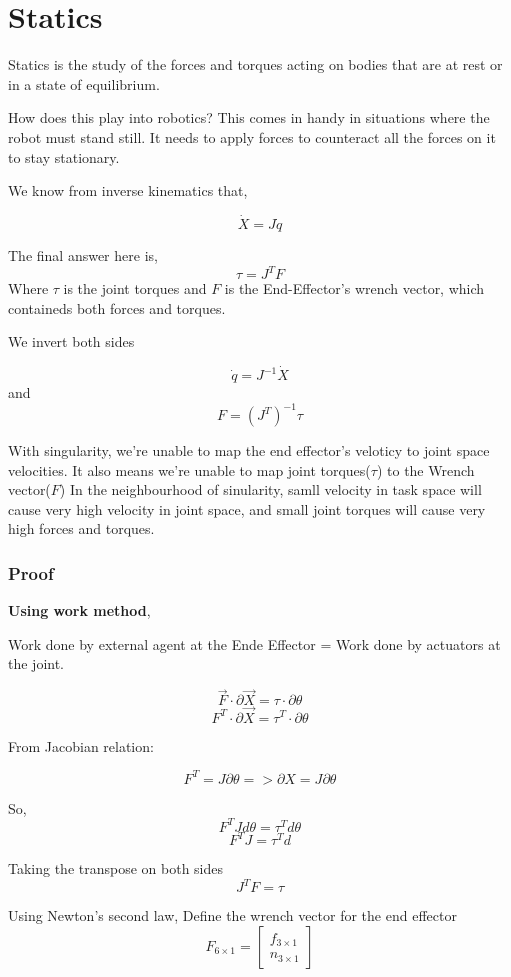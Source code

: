 \documentclass[11pt]{report}
\begin{document}
\part{Statics}
\label{sec:org2be51d6}
Statics is the study of the forces and torques acting on bodies that are at rest or in a state of equilibrium.

How does this play into robotics? This comes in handy in situations where the robot must stand still. It needs to apply forces to counteract all the forces on it to stay stationary.

We know from inverse kinematics that,

$$\dot{X} = J \dot{q}$$

The final answer here is,
$$\tau = J^TF$$
Where \(\tau\) is the joint torques and \(F\) is the End-Effector's wrench vector, which containeds both forces and torques.

We invert both sides

$$\dot{q} = J^{-1}\dot{X}$$ and $$F = (J^T)^{-1}\tau$$

With singularity, we're unable to map the end effector's veloticy to joint space velocities. It also means we're unable to map joint torques(\(\tau\)) to the Wrench vector(\(F\)) In the neighbourhood of  sinularity, samll velocity in task space will cause very high velocity in joint space, and small joint torques will cause very high forces and torques.
\section{Proof}
\label{sec:org861f4ed}
\textbf{Using work method},

Work done by external agent at the Ende Effector = Work done by actuators at the joint.

$$\vec{F} \cdot \partial {\vec{X}} = \tau \cdot \partial \theta $$
$${F}^{T} \cdot \partial {\vec{X}} = \tau^{T} \cdot \partial \theta $$

From Jacobian relation:

$$F^T = J \partial \theta => \partial X = J \partial \theta$$

So,
$$F^T J d \theta = \tau^T d \theta$$
$$F^T J = \tau^T d$$

Taking the transpose on both sides
$$J^{T} F  = \tau$$

Using Newton's second law,
Define the wrench vector for the end effector
$$F_{6 \times 1} = \begin{bmatrix}f_{3 \times 1} \\ n_{3 \times 1}\end{bmatrix}$$
\end{document}
